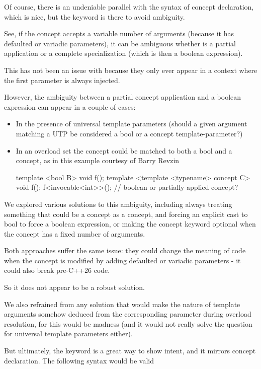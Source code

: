 \documentclass{wg21}
\begin{document}
Of course, there is an undeniable parallel with the syntax of concept declaration, which is nice, but the keyword is there to avoid ambiguity.

See, if the concept accepts a variable number of arguments (because it has defaulted or variadic parameters),
it can be ambiguous whether  is a partial application or a complete specialization
(which is then a boolean expression).

This has not been an issue with  because they only ever appear in a context where the first parameter is always injected.

However, the ambiguity between a partial concept application and a boolean expression can appear in a couple of cases:
\begin{itemize}
    \item In the presence of universal template parameters (should a given argument matching a UTP be considered a bool or a concept template-parameter?)
    \item In an overload set the concept could be matched to both a bool and a concept, as in this example courtesy of Barry Revzin
\begin{colorblock}
template <bool B> void f();
template <template <typename> concept C> void f();
f<invocable<int>>(); // boolean or partially applied concept?
\end{colorblock}
\end{itemize}

We explored various solutions to this ambiguity, including always treating something that could be a concept as a concept,
and forcing an explicit cast to bool to force a boolean expression, or making the concept keyword optional when the concept has a fixed number of arguments.

Both approaches suffer the same issue: they could change the meaning of code when the concept is modified by adding defaulted or variadic
parameters - it could also break pre-C++26 code.

So it does not appear to be a robust solution.

We also refrained from any solution that would make the nature of template arguments somehow deduced from the corresponding parameter
during overload resolution, for this would be madness (and it would not really solve the question for universal template parameters either).

But ultimately, the  keyword is a great way to show intent, and it mirrors concept declaration. The following syntax would be valid
\end{document}
